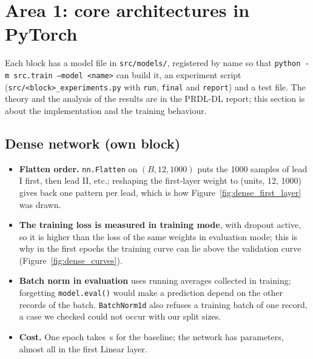\section{Area 1: core architectures in PyTorch}\label{sec:arch-code}

Each block has a model file in \texttt{src/models/}, registered by name so that
\texttt{python -m src.train --model <name>} can build it, an experiment script
(\texttt{src/<block>\_experiments.py} with \texttt{run}, \texttt{final} and \texttt{report}) and a test
file. The theory and the analysis of the results are in the PRDL-DL report; this section is about the
implementation and the training behaviour.

\subsection{Dense network (own block)}



\begin{itemize}[leftmargin=1.2em,itemsep=1pt]
  \item \textbf{Flatten order.} \texttt{nn.Flatten} on $(B, 12, 1000)$ puts the 1000 samples of lead I
        first, then lead II, etc.; reshaping the first-layer weight to (units, 12, 1000) gives back one
        pattern per lead, which is how Figure~\ref{fig:dense_first_layer} was drawn.
  \item \textbf{The training loss is measured in training mode}, with dropout active, so it is higher
        than the loss of the same weights in evaluation mode; this is why in the first epochs the
        training curve can lie above the validation curve (Figure~\ref{fig:dense_curves}).
  \item \textbf{Batch norm in evaluation} uses running averages collected in training; forgetting
        \texttt{model.eval()} would make a prediction depend on the other records of the batch.
        \texttt{BatchNorm1d} also refuses a training batch of one record, a case we checked could not
        occur with our split sizes.
  \item \textbf{Cost.} One epoch takes \denseEpochTimeMeanBase{}\,s for the baseline; the network has
        \denseParamsBase{} parameters, almost all in the first Linear layer.
\end{itemize}

